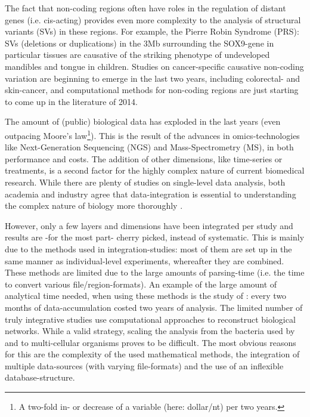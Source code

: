 \documentclass[twoside,fontsize=12pt]{article}
\begin{document}
The fact that non-coding regions often have roles in the regulation of distant genes (i.e. cis-acting) provides even more complexity to the analysis of structural variants (SVs) in these regions. For example, the Pierre Robin Syndrome (PRS): SVs (deletions or duplications) in the 3Mb surrounding the SOX9-gene in particular tissues are causative of the striking phenotype of undeveloped mandibles and tongue in children\cite{Benko2009,Kurth2009}. Studies on cancer-specific causative non-coding variation are beginning to emerge in the last two years, including colorectal- and skin-cancer\cite{Ongen2014,Huang2013}, and computational methods for non-coding regions are just starting to come up in the literature of 2014\cite{Khurana2013,Kircher2014}.  
\medskip

\noindent
The amount of (public) biological data has exploded in the last years (even outpacing Moore's law\footnote{A two-fold in- or decrease of a variable (here: dollar/nt) per two years.}). This is the result of the advances in omics-technologies like Next-Generation Sequencing (NGS) and Mass-Spectrometry (MS), in both performance and costs. The addition of other dimensions, like time-series or treatments, is a second factor for the highly complex nature of current biomedical research. While there are plenty of studies on single-level data analysis, both academia and industry agree that data-integration is essential to understanding the complex nature of biology more thoroughly \citep{Gomez-Cabrero2014, Huttenhower2010, Searls2005, Hamid2009}. 

However, only a few layers and dimensions have been integrated per study and results are -for the most part- cherry picked, instead of systematic. This is mainly due to the methods used in integration-studies: most of them are set up in the same manner as individual-level experiments, whereafter they are combined. These methods are limited due to the large amounts of parsing-time (i.e. the time to convert various file/region-formats). An example of the large amount of analytical time needed, when using these methods is the study of \citet{Munoz2011}: every two months of data-accumulation costed two years of analysis. The limited number of truly integrative studies use computational approaches to reconstruct biological networks. While a valid strategy, scaling the analysis from the bacteria used by \citet{Karr2012} and \citet{Lerman2012} to multi-cellular organisms proves to be difficult. The most obvious reasons for this are the complexity of the used mathematical methods, the integration of multiple data-sources (with varying file-formats) and the use of an inflexible database-structure.
\medskip
\end{document}
